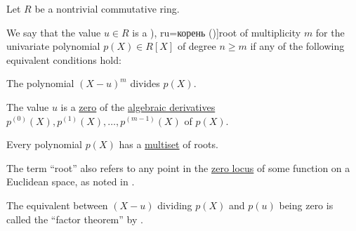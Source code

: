 \begin{definition}\label{def:polynomial_root}\mimprovised
  Let \( R \) be a nontrivial commutative ring.

  We say that the value \( u \in R \) is a \term[bg=корен (\cite[page 2 in \textparagraph 20]{НеновБожилов2007}), ru=корень (\cite[99]{Винберг2014})]{root} of multiplicity \( m \) for the univariate polynomial \( p(X) \in R[X] \) of degree \( n \geq m \) if any of the following equivalent conditions hold:
  \begin{thmenum}
     The polynomial \( (X - u)^m \) divides \( p(X) \).

     The value \( u \) is a \hyperref[def:zero_locus]{zero} of the \hyperref[def:algebraic_derivative]{algebraic derivatives} \( p^{(0)}(X), p^{(1)}(X), \ldots, p^{(m-1)}(X) \) of \( p(X) \).
  \end{thmenum}

  Every polynomial \( p(X) \) has a \hyperref[def:labeled_set/multiset]{multiset} of roots.
\end{definition}
\begin{comments}
  \item The term \enquote{root} also refers to any point in the \hyperref[def:zero_locus]{zero locus} of some function on a Euclidean space, as noted in .

  \item The equivalent between \( (X - u) \) dividing \( p(X) \) and \( p(u) \) being zero is called the \enquote{factor theorem} by .
\end{comments}
